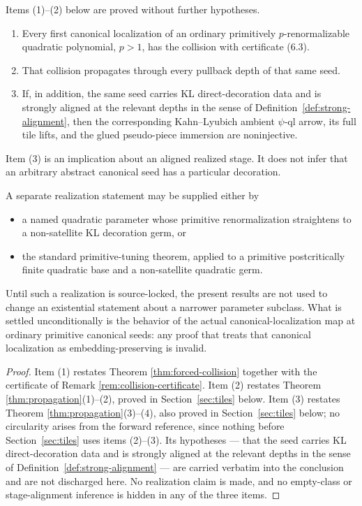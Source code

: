 \begin{proposition}\label{prop:realization}
Items (1)--(2) below are proved without further hypotheses.
\begin{enumerate}
\item Every first canonical localization of an ordinary primitively \(p\)-renormalizable quadratic polynomial, \(p>1\), has the collision with certificate (6.3).
\item That collision propagates through every pullback depth of that same seed.
\item If, in addition, the same seed carries KL direct-decoration data and is strongly aligned at the relevant depths in the sense of Definition~\ref{def:strong-alignment}, then the corresponding Kahn--Lyubich ambient \(\psi\)-ql arrow, its full tile lifts, and the glued pseudo-piece immersion are noninjective.
\end{enumerate}
Item (3) is an implication about an aligned realized stage.  It does not infer that an arbitrary abstract canonical seed has a particular decoration.
\end{proposition}

\begin{remark}\label{rem:realization-routes}
A separate realization statement may be supplied either by
\begin{itemize}
\item a named quadratic parameter whose primitive renormalization straightens to a non-satellite KL decoration germ, or
\item the standard primitive-tuning theorem, applied to a primitive postcritically finite quadratic base and a non-satellite quadratic germ.
\end{itemize}
Until such a realization is source-locked, the present results are not used to change an existential statement about a narrower parameter subclass.  What is settled unconditionally is the behavior of the actual canonical-localization map at ordinary primitive canonical seeds: any proof that treats that canonical localization as embedding-preserving is invalid.
\end{remark}

\begin{proof}
Item (1) restates Theorem \ref{thm:forced-collision} together with the certificate of Remark \ref{rem:collision-certificate}.  Item (2) restates Theorem \ref{thm:propagation}(1)--(2), proved in Section~\ref{sec:tiles} below.  Item (3) restates Theorem \ref{thm:propagation}(3)--(4), also proved in Section~\ref{sec:tiles} below; no circularity arises from the forward reference, since nothing before Section~\ref{sec:tiles} uses items (2)--(3).  Its hypotheses --- that the seed carries KL direct-decoration data and is strongly aligned at the relevant depths in the sense of Definition~\ref{def:strong-alignment} --- are carried verbatim into the conclusion and are not discharged here.  No realization claim is made, and no empty-class or stage-alignment inference is hidden in any of the three items.
\end{proof}

